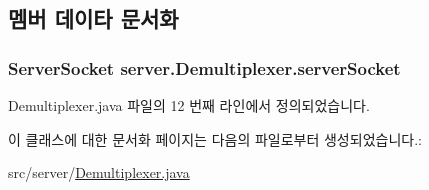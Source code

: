 \subsection{멤버 데이타 문서화}
\hypertarget{classserver_1_1_demultiplexer_a45a45c637b717c6d3114e8f3ade5b477}{
\subsubsection[{server\-Socket}]{\setlength{\rightskip}{0pt plus 5cm}Server\-Socket server.\-Demultiplexer.\-server\-Socket\hspace{0.3cm}{\ttfamily [private]}}}\label{classserver_1_1_demultiplexer_a45a45c637b717c6d3114e8f3ade5b477}


Demultiplexer.\-java 파일의 12 번째 라인에서 정의되었습니다.



이 클래스에 대한 문서화 페이지는 다음의 파일로부터 생성되었습니다.\-:\begin{DoxyCompactItemize}
\item 
src/server/\hyperlink{_demultiplexer_8java}{Demultiplexer.\-java}\end{DoxyCompactItemize}
